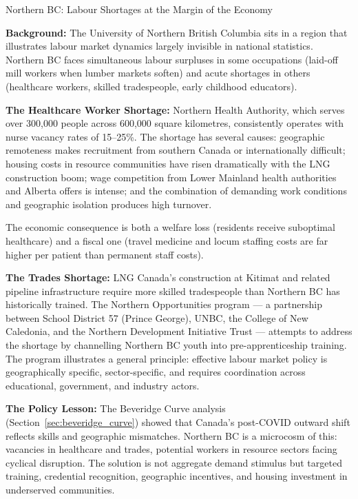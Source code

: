 \begin{casestudy}{Northern BC: Labour Shortages at the Margin of the Economy}

\textbf{Background:} The University of Northern British Columbia sits in
a region that illustrates labour market dynamics largely invisible in
national statistics. Northern BC faces simultaneous labour surpluses in
some occupations (laid-off mill workers when lumber markets soften) and
acute shortages in others (healthcare workers, skilled tradespeople,
early childhood educators).

\textbf{The Healthcare Worker Shortage:} Northern Health Authority,
which serves over 300{,}000 people across 600{,}000 square kilometres,
consistently operates with nurse vacancy rates of 15--25\%. The shortage
has several causes: geographic remoteness makes recruitment from southern
Canada or internationally difficult; housing costs in resource communities
have risen dramatically with the LNG construction boom; wage competition
from Lower Mainland health authorities and Alberta offers is intense;
and the combination of demanding work conditions and geographic isolation
produces high turnover.

The economic consequence is both a welfare loss (residents receive
suboptimal healthcare) and a fiscal one (travel medicine and locum
staffing costs are far higher per patient than permanent staff costs).

\textbf{The Trades Shortage:} LNG Canada's construction at Kitimat and
related pipeline infrastructure require more skilled tradespeople than
Northern BC has historically trained. The Northern Opportunities program
--- a partnership between School District 57 (Prince George), UNBC, the
College of New Caledonia, and the Northern Development Initiative Trust
--- attempts to address the shortage by channelling Northern BC youth
into pre-apprenticeship training. The program illustrates a general
principle: effective labour market policy is geographically specific,
sector-specific, and requires coordination across educational, government,
and industry actors.

\textbf{The Policy Lesson:} The Beveridge Curve analysis (Section~\ref{sec:beveridge_curve})
showed that Canada's post-COVID outward shift reflects skills and geographic
mismatches. Northern BC is a microcosm of this: vacancies in healthcare and
trades, potential workers in resource sectors facing cyclical disruption.
The solution is not aggregate demand stimulus but targeted training,
credential recognition, geographic incentives, and housing investment
in underserved communities.
\end{casestudy}

